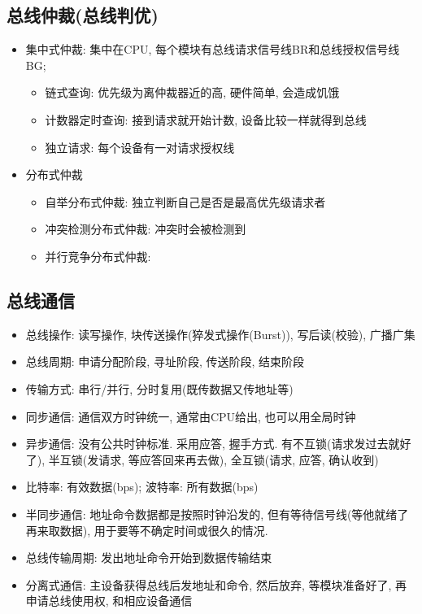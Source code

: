 \documentclass[UTF8]{article}
\begin{document}
\subsection{总线仲裁(总线判优)}
\begin{itemize}
\item 集中式仲裁: 集中在CPU, 每个模块有总线请求信号线BR和总线授权信号线BG; 
	\begin{itemize}
	\item 链式查询: 优先级为离仲裁器近的高, 硬件简单, 会造成饥饿
	\item 计数器定时查询: 接到请求就开始计数, 设备比较一样就得到总线
	\item 独立请求: 每个设备有一对请求授权线
	\end{itemize}
\item 分布式仲裁
	\begin{itemize}
	\item 自举分布式仲裁: 独立判断自己是否是最高优先级请求者
	\item 冲突检测分布式仲裁: 冲突时会被检测到
	\item 并行竞争分布式仲裁: 
	\end{itemize}
\end{itemize}
\subsection{总线通信}
\begin{itemize}
\item 总线操作: 读写操作, 块传送操作(猝发式操作(Burst)), 写后读(校验), 广播广集
\item 总线周期: 申请分配阶段, 寻址阶段, 传送阶段, 结束阶段
\item 传输方式: 串行/并行, 分时复用(既传数据又传地址等)
\item 同步通信: 通信双方时钟统一, 通常由CPU给出, 也可以用全局时钟
\item 异步通信: 没有公共时钟标准. 采用应答, 握手方式. 有不互锁(请求发过去就好了), 半互锁(发请求, 等应答回来再去做), 全互锁(请求, 应答, 确认收到)
\item 比特率: 有效数据(bps); 波特率: 所有数据(bps)
\item 半同步通信: 地址命令数据都是按照时钟沿发的, 但有等待信号线(等他就绪了再来取数据), 用于要等不确定时间或很久的情况.
\item 总线传输周期: 发出地址命令开始到数据传输结束
\item 分离式通信: 主设备获得总线后发地址和命令, 然后放弃, 等模块准备好了, 再申请总线使用权, 和相应设备通信
\end{itemize}
\end{document}
